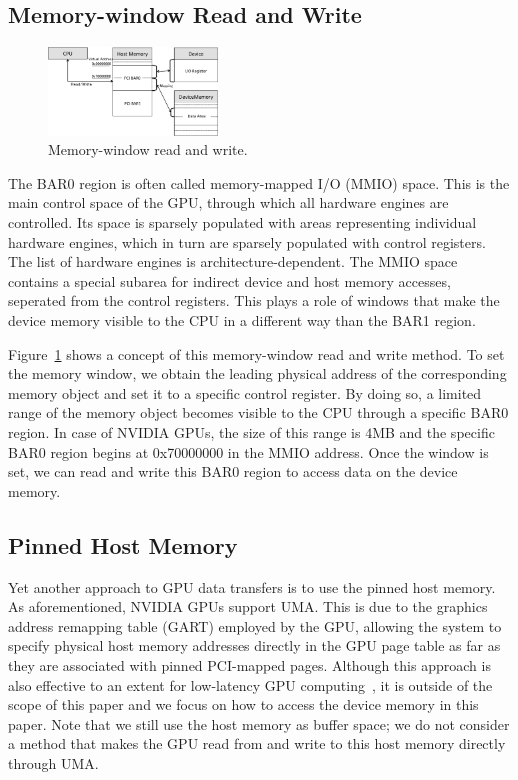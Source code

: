 \subsection{Memory-window Read and Write}
\label{sec:memwnd}

\begin{figure}[!t]
 \centering
 \includegraphics[width=0.4\textwidth]{figure/Method/MEMWND_Method.pdf}
 \caption{Memory-window read and write.}
 \label{fig:memwnd}
\end{figure}

The BAR0 region is often called memory-mapped I/O (MMIO) space.
This is the main control space of the GPU, through which all hardware
engines are controlled.
Its space is sparsely populated with areas representing individual
hardware engines, which in turn are sparsely populated with control
registers.
The list of hardware engines is architecture-dependent.
The MMIO space contains a special subarea for indirect device and host
memory accesses, seperated from the control registers.
This plays a role of windows that make the device memory visible to the
CPU in a different way than the BAR1 region.

Figure~\ref{fig:memwnd} shows a concept of this memory-window read and
write method.
To set the memory window, we obtain the leading physical address of the
corresponding memory object and set it to a specific control register.
By doing so, a limited range of the memory object becomes visible to the
CPU through a specific BAR0 region.
In case of NVIDIA GPUs, the size of this range is $4$MB and the specific
BAR0 region begins at 0x70000000 in the MMIO address.
Once the window is set, we can read and write this BAR0 region to access
data on the device memory.

\subsection{Pinned Host Memory}

Yet another approach to GPU data transfers is to use the pinned host
memory.
As aforementioned, NVIDIA GPUs support UMA.
This is due to the graphics address remapping table (GART) employed by
the GPU, allowing the system to specify physical host memory addresses
directly in the GPU page table as far as they are associated with pinned
PCI-mapped pages.
Although this approach is also effective to an extent for low-latency
GPU computing~\cite{Kato_ICCPS13}, it is outside of the scope of this
paper and we focus on how to access the device memory in this paper.
Note that we still use the host memory as buffer space; we do not
consider a method that makes the GPU read from and write to this host
memory directly through UMA.
